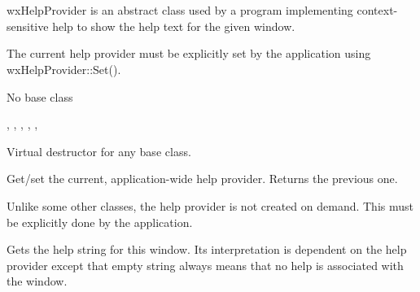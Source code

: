 \section{}\label{wxhelpprovider}

wxHelpProvider is an abstract class used by a program implementing context-sensitive help to
show the help text for the given window.

The current help provider must be explicitly set by the application using
wxHelpProvider::Set().


No base class


, , 
, , 
, 


\label{wxhelpproviderdtor}


Virtual destructor for any base class.

\label{wxhelpproviderset}


Get/set the current, application-wide help provider. Returns
the previous one.

\label{wxhelpproviderget}


Unlike some other classes, the help provider is not created on demand.
This must be explicitly done by the application.

\label{wxhelpprovidergethelp}


Gets the help string for this window. Its interpretation is dependent on the help provider
except that empty string always means that no help is associated with
the window.

\label{wxhelpprovidershowhelp}

